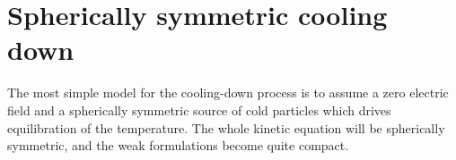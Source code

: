 \documentclass[reprint]{revtex4}
\begin{document}

\section{Spherically symmetric cooling down}
The most simple model for the cooling-down process is to assume a zero electric field and a spherically symmetric source of cold particles which drives equilibration of the temperature. The whole kinetic equation will be spherically symmetric, and the weak formulations become quite compact. 
\end{document}
